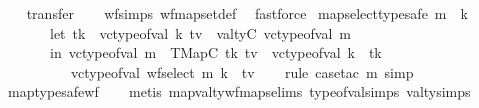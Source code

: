 \begin{isabellebody}
%
\isadelimproof
\ \ %
\endisadelimproof
%
\isatagproof
{}\isamarkupfalse%
\ transfer\isanewline
\ \ \isamarkupfalse%
\ wf{\isachardot}{\kern0pt}simps\ wf{\isacharunderscore}{\kern0pt}map{\isacharunderscore}{\kern0pt}set{\isacharunderscore}{\kern0pt}def\ \isamarkupfalse%
\ fastforce%
\endisatagproof
{\isafoldproof}%
%
\isadelimproof
\isanewline
%
\endisadelimproof
\isanewline
{}\isamarkupfalse%
\ map{\isacharunderscore}{\kern0pt}select{\isacharunderscore}{\kern0pt}type{\isacharunderscore}{\kern0pt}safe{\isacharcolon}{\kern0pt}\ {\isachardoublequoteopen}{\isasymforall}m\ \ k{\isachardot}{\kern0pt}\isanewline
\ \ \ \ \ \ \ let\ tk\ {\isacharequal}{\kern0pt}\ vc{\isacharunderscore}{\kern0pt}type{\isacharunderscore}{\kern0pt}of{\isacharunderscore}{\kern0pt}val\ k{\isacharsemicolon}{\kern0pt}\ tv\ {\isacharequal}{\kern0pt}\ val{\isacharunderscore}{\kern0pt}tyC\ {\isacharparenleft}{\kern0pt}vc{\isacharunderscore}{\kern0pt}type{\isacharunderscore}{\kern0pt}of{\isacharunderscore}{\kern0pt}val\ m{\isacharparenright}{\kern0pt}\isanewline
\ \ \ \ \ \ \ in\ vc{\isacharunderscore}{\kern0pt}type{\isacharunderscore}{\kern0pt}of{\isacharunderscore}{\kern0pt}val\ m\ {\isacharequal}{\kern0pt}\ TMapC\ tk\ tv\ {\isasymand}\ vc{\isacharunderscore}{\kern0pt}type{\isacharunderscore}{\kern0pt}of{\isacharunderscore}{\kern0pt}val\ k\ {\isacharequal}{\kern0pt}\ tk\ {\isasymlongrightarrow}\isanewline
\ \ \ \ \ \ \ \ \ \ vc{\isacharunderscore}{\kern0pt}type{\isacharunderscore}{\kern0pt}of{\isacharunderscore}{\kern0pt}val\ {\isacharparenleft}{\kern0pt}wf{\isacharunderscore}{\kern0pt}select\ m\ k{\isacharparenright}{\kern0pt}\ {\isacharequal}{\kern0pt}\ tv{\isachardoublequoteclose}\isanewline
%
\isadelimproof
\ \ %
\endisadelimproof
%
\isatagproof
{}\isamarkupfalse%
\ {\isacharparenleft}{\kern0pt}rule{\isacharcomma}{\kern0pt}\ case{\isacharunderscore}{\kern0pt}tac\ m{\isacharsemicolon}{\kern0pt}\ simp{\isacharparenright}{\kern0pt}\ \isamarkupfalse%
\ map{\isacharunderscore}{\kern0pt}type{\isacharunderscore}{\kern0pt}safe{\isacharunderscore}{\kern0pt}wf\isanewline
\ \ \isamarkupfalse%
\ {\isacharparenleft}{\kern0pt}metis\ mapval{\isacharunderscore}{\kern0pt}ty{\isacharunderscore}{\kern0pt}wf{\isacharunderscore}{\kern0pt}maps{\isachardot}{\kern0pt}elims\ type{\isacharunderscore}{\kern0pt}of{\isacharunderscore}{\kern0pt}val{\isachardot}{\kern0pt}simps{\isacharparenleft}{\kern0pt}{}{\isacharparenright}{\kern0pt}\ val{\isacharunderscore}{\kern0pt}ty{\isachardot}{\kern0pt}simps{\isacharparenleft}{\kern0pt}{}{\isacharparenright}{\kern0pt}{\isacharparenright}{\kern0pt}%

\end{isabellebody}
